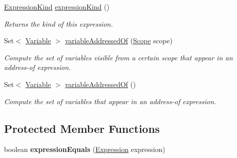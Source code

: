 \begin{DoxyCompactItemize}
\item 
\hyperlink{enumedu_1_1udel_1_1cis_1_1vsl_1_1civl_1_1model_1_1IF_1_1expression_1_1Expression_1_1ExpressionKind}{Expression\+Kind} \hyperlink{classedu_1_1udel_1_1cis_1_1vsl_1_1civl_1_1model_1_1common_1_1expression_1_1CommonDynamicTypeOfExpression_a58c4dc7906f4454f2d8e3146006164c2}{expression\+Kind} ()
\begin{DoxyCompactList}\small\item\em Returns the kind of this expression. \end{DoxyCompactList}\item 
Set$<$ \hyperlink{interfaceedu_1_1udel_1_1cis_1_1vsl_1_1civl_1_1model_1_1IF_1_1variable_1_1Variable}{Variable} $>$ \hyperlink{classedu_1_1udel_1_1cis_1_1vsl_1_1civl_1_1model_1_1common_1_1expression_1_1CommonDynamicTypeOfExpression_a2c5222cd3c90dc826c60e0980323cc20}{variable\+Addressed\+Of} (\hyperlink{interfaceedu_1_1udel_1_1cis_1_1vsl_1_1civl_1_1model_1_1IF_1_1Scope}{Scope} scope)
\begin{DoxyCompactList}\small\item\em Compute the set of variables visible from a certain scope that appear in an address-\/of expression. \end{DoxyCompactList}\item 
Set$<$ \hyperlink{interfaceedu_1_1udel_1_1cis_1_1vsl_1_1civl_1_1model_1_1IF_1_1variable_1_1Variable}{Variable} $>$ \hyperlink{classedu_1_1udel_1_1cis_1_1vsl_1_1civl_1_1model_1_1common_1_1expression_1_1CommonDynamicTypeOfExpression_a097bd44ce90e449a902949c9c953450d}{variable\+Addressed\+Of} ()
\begin{DoxyCompactList}\small\item\em Compute the set of variables that appear in an address-\/of expression. \end{DoxyCompactList}\end{DoxyCompactItemize}
\subsection*{Protected Member Functions}
\begin{DoxyCompactItemize}
\item 
\hypertarget{classedu_1_1udel_1_1cis_1_1vsl_1_1civl_1_1model_1_1common_1_1expression_1_1CommonDynamicTypeOfExpression_ac10d7a7af4f4335393d478bda333099f}{}boolean {\bfseries expression\+Equals} (\hyperlink{interfaceedu_1_1udel_1_1cis_1_1vsl_1_1civl_1_1model_1_1IF_1_1expression_1_1Expression}{Expression} expression)\label{classedu_1_1udel_1_1cis_1_1vsl_1_1civl_1_1model_1_1common_1_1expression_1_1CommonDynamicTypeOfExpression_ac10d7a7af4f4335393d478bda333099f}

\end{DoxyCompactItemize}
